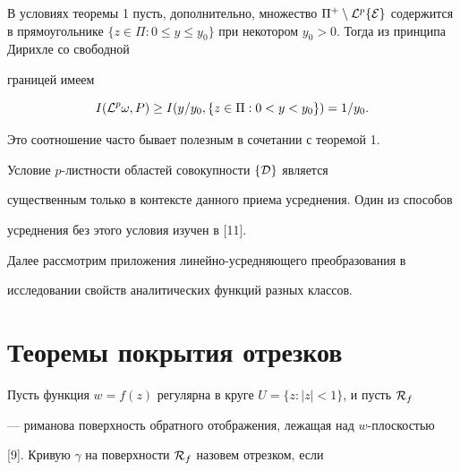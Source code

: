 




\begin{note}


В условиях теоремы 1 пусть, дополнительно, множество $\Pi^+


\setminus{\cal L}^p\{{\cal E}\}$ содержится в прямоугольнике $\{z\in\Pi: 0\le


y\leq y_0\}$ при некотором $y_0>0$. Тогда из принципа Дирихле со свободной


границей имеем


\begin{equation}


I({\cal L}^p\omega,P)\geq I(y/y_0,\{z\in \Pi:0<y<y_0\})=1/y_0.


\end{equation}


Это соотношение часто бывает полезным в сочетании с теоремой 1.


\end{note}





\begin{note}


Условие $p$-листности областей совокупности $\{{\cal D}\}$ является


существенным только в контексте данного приема усреднения. Один из способов


усреднения без этого условия изучен в [11].


\end{note}





Далее рассмотрим приложения линейно-усредняющего преобразования в


исследовании свойств аналитических функций разных классов.





\section{Теоремы покрытия отрезков}





Пусть функция $w=f(z)$ регулярна в круге $U=\{z:|z|<1\}$, и пусть ${\cal R}_f$


--- риманова поверхность обратного отображения, лежащая над $w$-плоскостью


[9]. Кривую $\gamma$ на поверхности ${\cal R}_f$ назовем отрезком, если


